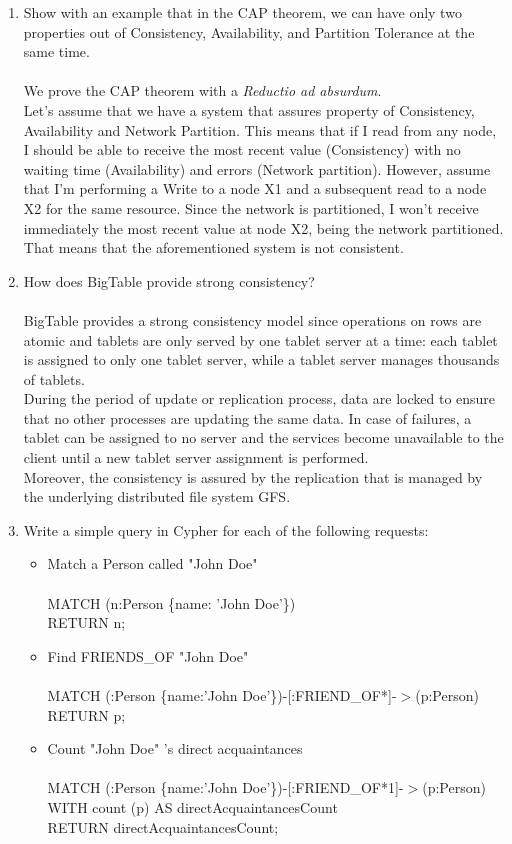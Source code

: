 \documentclass[]{report}
\begin{document}
\begin{enumerate}
 
 \item Show with an example that in the CAP theorem, we can have only two properties out of Consistency, Availability, and Partition Tolerance at the same time.\\\\
We prove the CAP theorem with a \textit{Reductio ad absurdum}.\\
Let's assume that we have a system that assures property of Consistency, Availability and Network Partition. This means that if I read from any node, I should be able to receive the most recent value (Consistency) with no waiting time (Availability) and errors (Network partition).
However, assume that I'm performing a Write to a node X1 and a subsequent read to a node X2 for the same resource. Since the network is partitioned, I won't receive immediately the most recent value at node X2, being the network partitioned. That means that the aforementioned system is not consistent. 
 
 \item How does BigTable provide strong consistency?\\\\
BigTable provides a strong consistency model since operations on rows are atomic and tablets are only served by one tablet server at a time: each tablet is assigned to only one tablet server, while a  tablet server manages thousands of tablets.\\
During the period of update or replication process, data are locked to ensure that no other processes are updating the same data. In case of failures, a tablet can be assigned to no server and the services become unavailable to the client until a new tablet server assignment is performed.\\ Moreover, the consistency is assured by the replication that is managed by the underlying distributed file system GFS. 
 \item Write a simple query in Cypher for each of the following requests:
 \begin{itemize}
    	\item Match a Person called "John Doe"\\\\
	MATCH (n:Person \{name: 'John Doe'\})\\
        RETURN n;\\
        \item Find FRIENDS\_OF "John Doe"\\\\
        MATCH (:Person \{name:'John Doe'\})-[:FRIEND\_OF*]-$>$(p:Person)\\
        RETURN p;\\
        \item Count "John Doe" 's direct acquaintances\\\\
     	MATCH (:Person \{name:'John Doe'\})-[:FRIEND\_OF*1]-$>$(p:Person)\\
	WITH count (p) AS directAcquaintancesCount\\
        RETURN directAcquaintancesCount;\\
  \end{itemize}

\end{enumerate}
\end{document}

